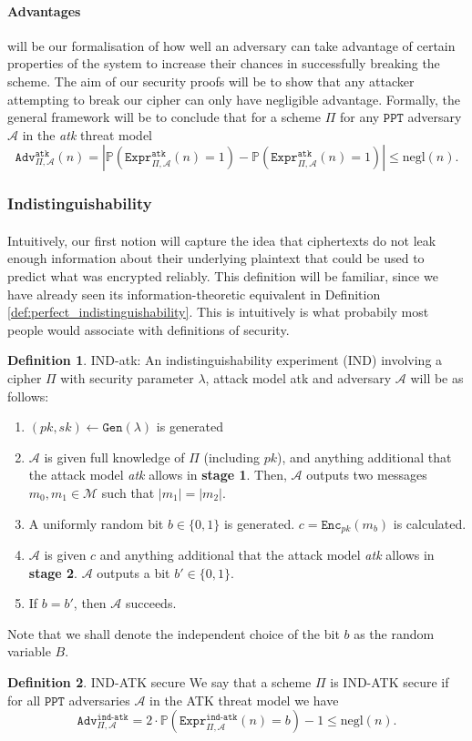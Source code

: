 \documentclass{article}
\theoremstyle{definition}
\newtheorem{definition}{Definition}[section]
\theoremstyle{example}
\newcommand{\Enc}{\texttt{Enc}}
\newcommand{\Gen}{\texttt{Gen}}
\newcommand{\M}{\mathcal{M}}
\newcommand{\A}{\mathcal{A}}
\newcommand{\Prob}{\mathbb{P}}
\newcommand{\PPT}{\texttt{PPT}}
\newcommand{\negl}{\text{negl}}
\newcommand{\Expr}[2]{\texttt{Expr}^{\texttt{#1}}_{#2}}
\newcommand{\Adv}[2]{\texttt{Adv}^{\texttt{#1}}_{#2}}
\begin{document}
\paragraph{Advantages} will be our formalisation of how well an adversary can
take advantage of certain properties of the system to increase their chances in
successfully breaking the scheme. The aim of our security proofs will be to show
that any attacker attempting to break our cipher can only have negligible
advantage. Formally, the general framework will be to conclude that for a scheme
$\Pi$ for any $\PPT$ adversary $\A$ in the \textit{atk} threat model
\[
  \Adv{atk}{\Pi, \A}(n) = |\Prob(\Expr{atk}{\Pi, \A}(n) = 1) - \Prob(\Expr{atk}{\Pi,
    \A}(n) = 1)| \leq \negl(n).
\]
\subsubsection{Indistinguishability}
\paragraph{} Intuitively, our first notion will capture the idea that
ciphertexts do not leak enough information about their underlying plaintext that
could be used to predict what was encrypted reliably. This definition will be
familiar, since we have already seen its information-theoretic equivalent in
Definition \ref{def:perfect_indistinguishability}. This is intuitively is what probabily
most people would associate with definitions of security.
\begin{definition}{IND-atk:}
  An indistinguishability experiment (IND) involving a cipher $\Pi$ with
  security parameter $\lambda$, attack model atk and adversary $\A$ will be as follows:
  \begin{enumerate}
  \item $(pk, sk) \leftarrow \Gen(\lambda)$ is generated
  \item $\A$ is given full knowledge of $\Pi$ (including $pk$), and anything additional that the
    attack model \textit{atk} allows in \textbf{stage 1}. Then, $\A$ outputs two messages
    $m_0, m_1 \in \M$ such that $|m_1| = |m_2|$.
  \item A uniformly random bit $b \in \{0, 1\}$ is generated. $c = \Enc_{pk}(m_b)$ is calculated.
  \item $\A$ is given $c$ and anything additional that the attack model
    \textit{atk} allows in \textbf{stage 2}. $\A$ outputs a bit $b' \in \{0,
    1\}$.
  \item If $b = b'$, then $\A$ succeeds.
  \end{enumerate}
\end{definition}
Note that we shall denote the independent choice of the bit $b$ as the random
variable $B$.
\begin{definition}{IND-ATK secure}
  \label{def:adv_ind}
  We say that a scheme $\Pi$ is IND-ATK secure if for all $\PPT$ adversaries
  $\A$ in the ATK threat model we have
  \[
    \Adv{ind-atk}{\Pi, \A} = 2\cdot\Prob(\Expr{ind-atk}{\Pi, \A}(n) = b)
    - 1
    \leq \negl(n).
  \]
\end{definition}
\end{document}
